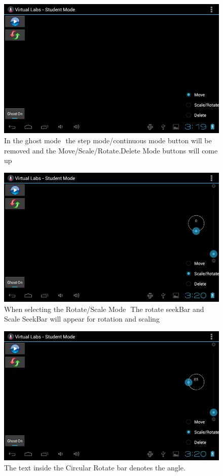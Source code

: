 \documentclass[12pt]{report}
\begin{document}
\begin{figure}[H]
 \centering
 \includegraphics[width=15cm]{./108.png}
 \caption{In the ghost mode ­ the step mode/continuous mode button will be removed and the Move/Scale/Rotate.Delete Mode buttons will come up\label{fig:108}}
\end{figure}

\begin{figure}[H]
 \centering
 \includegraphics[width=15cm]{./109.png}
 \caption{When selecting the Rotate/Scale Mode ­ The rotate seekBar and Scale SeekBar will appear for rotation and scaling\label{fig:109}}
\end{figure}

\begin{figure}[H]
 \centering
 \includegraphics[width=15cm]{./110.png}
 \caption{The text inside the Circular Rotate bar denotes the angle.\label{fig:110}}
\end{figure}
\end{document}
